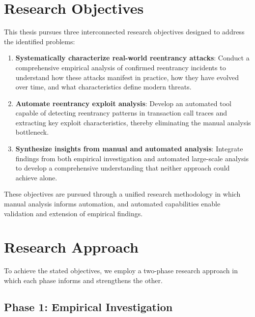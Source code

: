 \section{Research Objectives}
\label{sec:intro-objectives}

This thesis pursues three interconnected research objectives designed to address the identified problems:

\begin{enumerate}
    \item \textbf{Systematically characterize real-world reentrancy attacks}: Conduct a comprehensive empirical analysis of confirmed reentrancy incidents to understand how these attacks manifest in practice, how they have evolved over time, and what characteristics define modern threats.

    \item \textbf{Automate reentrancy exploit analysis}: Develop an automated tool capable of detecting reentrancy patterns in transaction call traces and extracting key exploit characteristics, thereby eliminating the manual analysis bottleneck.

    \item \textbf{Synthesize insights from manual and automated analysis}: Integrate findings from both empirical investigation and automated large-scale analysis to develop a comprehensive understanding that neither approach could achieve alone.
\end{enumerate}

These objectives are pursued through a unified research methodology in which manual analysis informs automation, and automated capabilities enable validation and extension of empirical findings.

\section{Research Approach}
\label{sec:intro-approach}

To achieve the stated objectives, we employ a two-phase research approach in which each phase informs and strengthens the other.

\subsection{Phase 1: Empirical Investigation}

